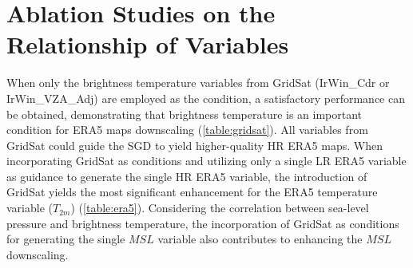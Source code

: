 \section{Ablation Studies on the Relationship of Variables}
When only the brightness temperature variables from GridSat (IrWin\_Cdr or IrWin\_VZA\_Adj) are employed as the condition, a satisfactory performance can be obtained, demonstrating that brightness temperature is an important condition for ERA5 maps downscaling (\cref{table:gridsat}).
All variables from GridSat could guide the SGD to yield higher-quality HR ERA5 maps.
When incorporating GridSat as conditions and utilizing only a single LR ERA5 variable as guidance to generate the single HR ERA5 variable, the introduction of GridSat yields the most significant enhancement for the ERA5 temperature variable ($T_{2m}$) (\cref{table:era5}).
Considering the correlation between sea-level pressure and brightness temperature, the incorporation of GridSat as conditions for generating the single $MSL$ variable also contributes to enhancing the $MSL$ downscaling.

\begin{table}[t]\small
  \centering
  \caption{Ablation study employing a single GridSat variable.}
  \vspace{-0.2cm}
  \label{table:gridsat}
\vspace{-0.2cm}
\end{table}


